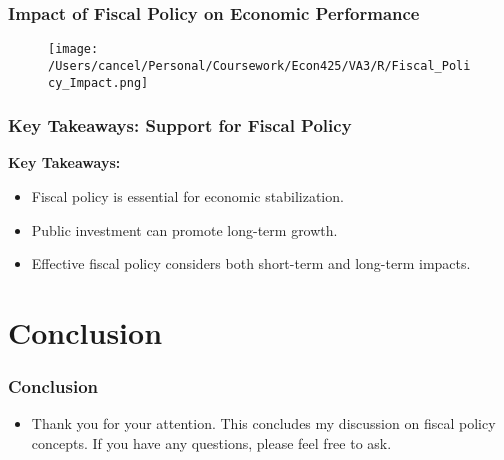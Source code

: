 \documentclass{beamer}
\begin{document}
\begin{frame}
    \frametitle{Impact of Fiscal Policy on Economic Performance}
    \begin{figure}[h!]
        \centering
        \texttt{[image: /Users/cancel/Personal/Coursework/Econ425/VA3/R/Fiscal\_Policy\_Impact.png]}
    \end{figure}
\end{frame}

\begin{frame}
    \frametitle{Key Takeaways: Support for Fiscal Policy}
    \textbf{Key Takeaways:}
    \begin{itemize}
        \item Fiscal policy is essential for economic stabilization.
        \item Public investment can promote long-term growth.
        \item Effective fiscal policy considers both short-term and long-term impacts.
    \end{itemize}
\end{frame}

\section{Conclusion}

\begin{frame}
    \frametitle{Conclusion}
    \begin{itemize}
        \item Thank you for your attention. This concludes my discussion on fiscal policy concepts. If you have any questions, please feel free to ask.
    \end{itemize}
\end{frame}
\end{document}
